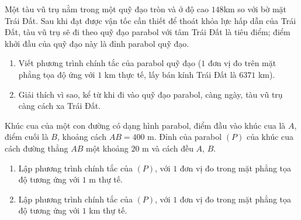 \begin{bt}%
	Một tàu vũ trụ nằm trong một quỹ đạo tròn và ở độ cao $148$km so với bờ mặt Trái Đất. Sau khi đạt được vận tốc cần thiết để thoát khỏa lực hấp dẫn của Trái Đất, tàu vũ trụ sẽ đi theo quỹ đạo parabol với tâm Trái Đất là tiêu điểm; điểm khởi đầu của quỹ đạo này là đỉnh parabol quỹ đạo.
	\begin{enumerate}
		\item Viết phương trình chính tắc của parabol quỹ đạo ($1$ đơn vị đo trên mặt phẳng tọa độ ứng với $1$ km thực tế, lấy bán kính Trái Đất là $6371$ km).
		\item Giải thích vì sao, kể từ khi đi vào quỹ đạo parabol, càng ngày, tàu vũ trụ càng cách xa Trái Đất.
	\end{enumerate}

\end{bt}

\begin{bt}%
	Khúc cua của một con đường có dạng hình parabol, điểm đầu vào khúc cua là $A$, điểm cuối là $B$, khoảng cách $AB=400$ m. Đỉnh của parabol $(P)$ của khúc cua cách đường  thẳng $AB$ một khoảng $20$ m và cách đều $A$, $B$.
	\begin{enumerate}
		\item Lập phương trình chính tắc của $(P)$, với $1$ đơn vị đo trong mặt phẳng tọa độ tương ứng với $1$ m thự tế.
		\item Lập phương trình chính tắc của $(P)$, với $1$ đơn vị đo trong mặt phẳng tọa độ tương ứng với $1$ km thự tế.
	\end{enumerate}
	
\end{bt}

